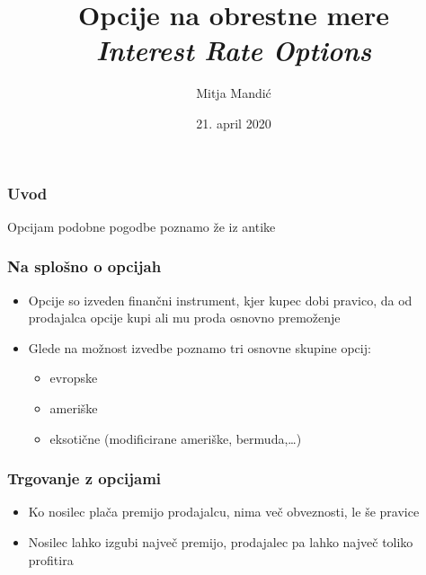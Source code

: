 \documentclass[14pt]{beamer}
\begin{document}
\title{Opcije na obrestne mere \\ \textit{Interest Rate Options}}
\author{Mitja Mandić}
\date{21. april 2020}

\begin{frame}
    \titlepage
\end{frame}

\begin{frame}
    \frametitle{Uvod}
    Opcijam podobne pogodbe poznamo že iz antike
\end{frame}

\begin{frame}
    \frametitle{Na splošno o opcijah}
    \begin{itemize}
        \item Opcije so izveden finančni instrument, kjer kupec dobi pravico, da od prodajalca opcije kupi 
        ali mu proda osnovno premoženje
        \item Glede na možnost izvedbe poznamo tri osnovne skupine opcij:
        \pause
        \begin{itemize}
            \item evropske
            \pause
            \item ameriške
            \pause
            \item eksotične (modificirane ameriške, bermuda,\ldots)
        \end{itemize}
    \end{itemize}
\end{frame}

\begin{frame}
    \frametitle{Trgovanje z opcijami}
    \begin{itemize}
        \item Ko nosilec plača premijo prodajalcu, nima več obveznosti, le še pravice
        \item Nosilec lahko izgubi največ premijo, prodajalec pa lahko največ toliko profitira
    \end{itemize}
\end{frame}

\end{document}
